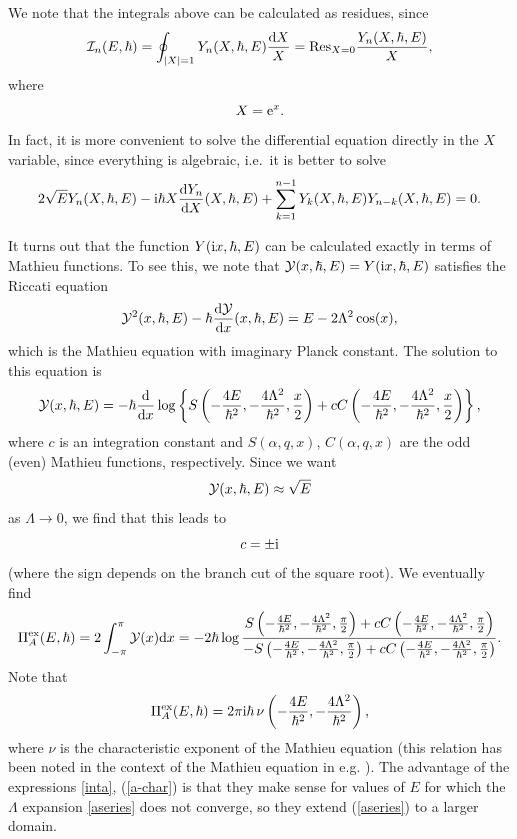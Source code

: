 \documentclass[a4paper,11pt]{article}
\theoremstyle{definition}
\newcommand{\CI}{{\cal I}}
\newcommand{\CY}{{\cal Y}}
\newcommand{\re}{{\rm e}}
\newcommand{\ri}{{\rm i}}
\newcommand{\rd}{{\rm d}}
\newcommand{\be}{\begin{equation}}
\newcommand{\ee}{\end{equation}}
\begin{document}
  
  We note that the integrals above can be calculated as residues, since 
  \be
  \CI_n (E, \hbar)=\oint_{|X|=1} Y_n(X, \hbar, E) {\rd X \over  X} ={\rm Res}_{X=0} { Y_n(X, \hbar, E) \over X}, 
  \ee
  where
  \be
  X=\re^x. 
  \ee
  In fact, it is more convenient to solve the differential equation
  directly in the $X$ variable, since everything is algebraic, i.e.\ it
  is better to solve
  \be 2 \sqrt{E} Y_n(X, \hbar, E) -\ri \hbar X {\rd Y_n \over \rd X
  }(X, \hbar, E)+\sum_{k=1}^{n-1} Y_k(X, \hbar, E) Y_{n-k}(X, \hbar,
  E)=0.  \ee
% 



It turns out that the function $Y(\ri x, \hbar, E)$ can be calculated exactly in terms of Mathieu functions. To see this, we note that $\CY(x, \hbar, E)=Y(\ri x, \hbar, E)$ satisfies the 
Riccati equation 
%
\be
\CY^2(x, \hbar, E) -\hbar {\rd \CY \over \rd x}(x, \hbar, E)= E- 2 \Lambda^2 \cos(x), 
\ee
%
which is the Mathieu equation with imaginary Planck constant. The solution to this equation is 
%
\be
\CY(x, \hbar, E)= -\hbar {\rd \over \rd x} \log \left\{ S \left(-{4 E \over \hbar^2}, -{4 \Lambda^2 \over\hbar^2}, {x\over 2}\right)+c C \left(-{4 E \over \hbar^2}, -{4 \Lambda^2 \over\hbar^2}, {x\over 2}\right)\right\}, 
\ee
%
where $c$ is an integration constant and $S(\alpha, q, x)$, $C(\alpha,q,x)$ are the odd (even) Mathieu functions, respectively. Since we want 
%
\be
\CY(x, \hbar, E) \approx {\sqrt{E}}
\ee
%
as $\Lambda \rightarrow 0$, we find that this leads to 
%
\be
c=\pm \ri
\ee
%
 (where the sign depends on the branch cut of the square root). We eventually find 
%
\be
\label{inta}
\Pi^{\rm ex}_A (E, \hbar) =  {2 }\int_{-\pi}^{\pi} \CY(x) \rd x = -{2 \hbar } \log {S \left(-{4 E \over \hbar^2}, -{4 \Lambda^2 \over\hbar^2}, {\pi\over 2}\right)+c C \left(-{4 E \over \hbar^2}, -{4 \Lambda^2 \over\hbar^2}, {\pi\over 2}\right) \over -S \left(-{4 E \over \hbar^2}, -{4 \Lambda^2 \over\hbar^2}, {\pi\over 2}\right)+c C \left(-{4 E \over \hbar^2}, -{4 \Lambda^2 \over\hbar^2}, {\pi\over 2}\right)}. 
\ee
%
Note that 
%
\be
\label{a-char}
\Pi^{\rm ex}_A(E, \hbar) =2 \pi  {\ri \hbar } \,\nu\left( -{4 E \over \hbar^2}, -{4 \Lambda^2 \over\hbar^2} \right), 
\ee
%
where $\nu$ is the characteristic exponent of the Mathieu equation (this relation has been noted in the context of the Mathieu equation in e.g. \cite{he-miao, kpt}). 
The advantage of the expressions \eqref{inta}, (\ref{a-char}) is that they make sense for values of $E$ for which the $\Lambda$ expansion \eqref{aseries} does not converge, so they extend 
(\ref{aseries}) to a larger domain. 
\end{document}
